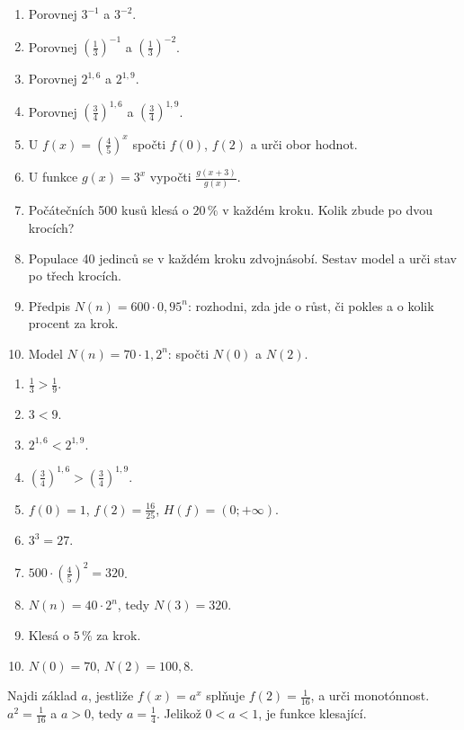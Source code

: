 \documentclass[11pt,a4paper]{article}
\begin{document}
\begin{zadaniReseniBox}[title={Samostatná práce 1}]
\begin{enumerate}[label=\alph*)]
\item Porovnej $3^{-1}$ a $3^{-2}$.
\item Porovnej $\left(\frac{1}{3}\right)^{-1}$ a $\left(\frac{1}{3}\right)^{-2}$.
\item Porovnej $2^{1{,}6}$ a $2^{1{,}9}$.
\item Porovnej $\left(\frac{3}{4}\right)^{1{,}6}$ a $\left(\frac{3}{4}\right)^{1{,}9}$.
\item U $f(x)=\left(\frac{4}{5}\right)^x$ spočti $f(0)$, $f(2)$ a urči obor hodnot.
\item U funkce $g(x)=3^x$ vypočti $\frac{g(x+3)}{g(x)}$.
\item Počátečních 500 kusů klesá o $20\,\%$ v každém kroku. Kolik zbude po dvou krocích?
\item Populace 40 jedinců se v každém kroku zdvojnásobí. Sestav model a urči stav po třech krocích.
\item Předpis $N(n)=600\cdot0{,}95^n$: rozhodni, zda jde o růst, či pokles a o kolik procent za krok.
\item Model $N(n)=70\cdot1{,}2^n$: spočti $N(0)$ a $N(2)$.
\end{enumerate}
\tcblower
\begin{enumerate}[label=\alph*)]
\item $\frac{1}{3}>\frac{1}{9}$.
\item $3<9$.
\item $2^{1{,}6}<2^{1{,}9}$.
\item $\left(\frac{3}{4}\right)^{1{,}6}>\left(\frac{3}{4}\right)^{1{,}9}$.
\item $f(0)=1$, $f(2)=\frac{16}{25}$, $H(f)=(0;+\infty)$.
\item $3^3=27$.
\item $500\cdot\left(\frac{4}{5}\right)^2=320$.
\item $N(n)=40\cdot2^n$, tedy $N(3)=320$.
\item Klesá o $5\,\%$ za krok.
\item $N(0)=70$, $N(2)=100{,}8$.
\end{enumerate}
\end{zadaniReseniBox}
\begin{zadaniReseniBox}[title={Rozšíření 1}]
Najdi základ $a$, jestliže $f(x)=a^x$ splňuje $f(2)=\frac{1}{16}$, a urči monotónnost.
\tcblower
$a^2=\frac{1}{16}$ a $a>0$, tedy $a=\frac{1}{4}$. Jelikož $0<a<1$, je funkce klesající.
\end{zadaniReseniBox}
\end{document}
